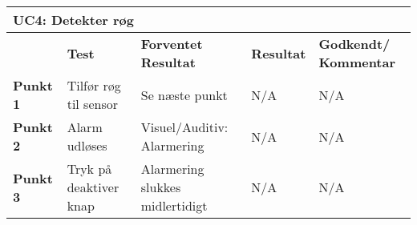 \begin{table}[htbp] \centering
\begin{tabular}{|p{}|p{}|p{3cm}|p{3cm}|p{3cm}|} %
	\hline
\multicolumn{5}{|l|}{\textbf{UC4: Detekter røg}} \\\hline
&\textbf{Test} &\textbf{Forventet \newline Resultat} &\textbf{Resultat} &\textbf{Godkendt/ \newline Kommentar} \\\hline
\textbf{Punkt 1} &
Tilfør røg til sensor &
Se næste punkt &
N/A & 
N/A \\\hline
\textbf{Punkt 2} &
Alarm udløses &
Visuel/Auditiv: Alarmering &
N/A	 &
N/A \\\hline
\textbf{Punkt 3} &
Tryk på deaktiver knap &
Alarmering slukkes midlertidigt&
N/A	 &
N/A \\\hline
	\end{tabular}
	\label{ATUC4} 
\end{table}